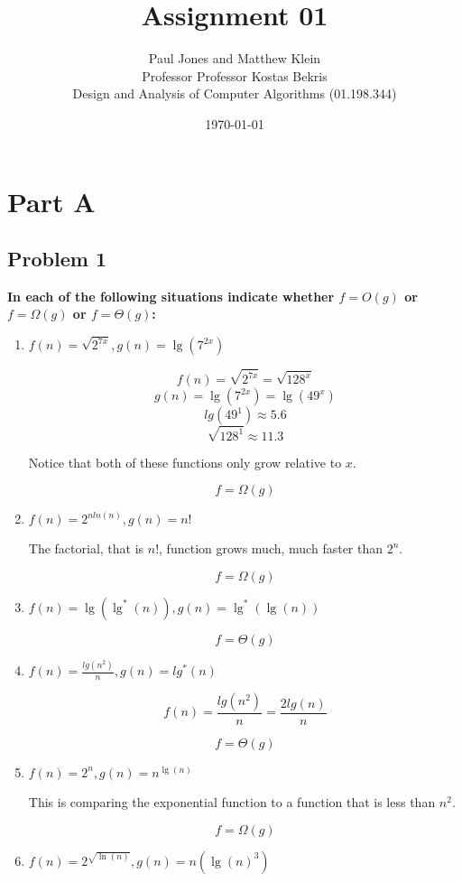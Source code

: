 \documentclass[11pt]{article}
\title{Assignment 01}
\author{Paul Jones and Matthew Klein \\
		Professor Professor Kostas Bekris\\
		Design and Analysis of Computer Algorithms (01.198.344)}
\date{\today}
\begin{document}
\maketitle

\pagebreak

\section*{Part A}

\subsection*{Problem 1}

\textbf{In each of the following situations indicate whether $f = O(g)$ or $f = \Omega(g)$ 
or $f = \Theta(g)$:}

\begin{enumerate}

	\item $f(n) = \sqrt{2^{7x}}, g(n) = \lg(7^{2x})$
		
		\[ f(n) = \sqrt{2^{7x}} = \sqrt{128^{x}}\]
		\[ g(n) = \lg(7^{2x}) = \lg(49^{x})\]
		\[ lg(49^1) \approx 5.6 \]
		\[ \sqrt{128^{1}} \approx 11.3 \]
		
		Notice that both of these functions only grow relative to $x$.
		
		\[ f = \Omega(g) \]
	
	\item $f(n) = 2^{nln(n)}, g(n) = n!$
	
		The factorial, that is $n!$, function grows much, much faster than $2^n$.
		
		\[ f = \Omega(g) \]
	
	\item $f(n) = \lg(\lg^*(n)), g(n) = \lg^*(\lg(n)) $
	
		\[ f = \Theta(g) \]
	
	\item $f(n) = \frac{lg(n^2)}{n}, g(n) = lg^*(n)$
	
		\[f(n) = \frac{lg(n^2)}{n} = \frac{2 lg(n)}{n}\]
		
		\[ f = \Theta(g) \]
		
	\item $f(n) = 2^n, g(n) = n^{\lg(n)}$
	
		This is comparing the exponential function to a function that is less than
		$n^2$.
		
		\[ f = \Omega(g) \]
		
	\item $f(n) = 2^{\sqrt{\ln(n)}}, g(n) = n(\lg(n)^3)$
	

\end{enumerate}
\end{document}
